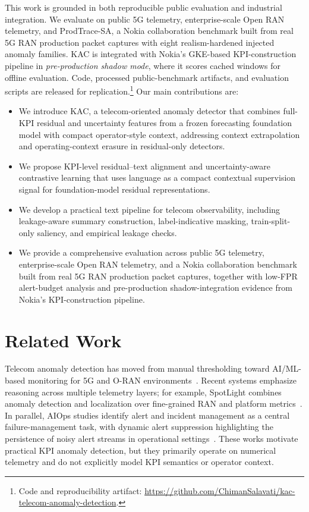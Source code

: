 \documentclass[conference]{IEEEtran}
\begin{document}
This work is grounded in both reproducible public evaluation and industrial integration. We evaluate on public 5G telemetry, enterprise-scale Open RAN telemetry, and ProdTrace-SA, a Nokia collaboration benchmark built from real 5G RAN production packet captures with eight realism-hardened injected anomaly families. KAC is integrated with Nokia's GKE-based KPI-construction pipeline in \emph{pre-production shadow mode}, where it scores cached windows for offline evaluation. Code, processed public-benchmark artifacts, and evaluation scripts are released for replication.\footnote{Code and reproducibility artifact: \url{https://github.com/ChimanSalavati/kac-telecom-anomaly-detection}.} Our main contributions are:
\begin{itemize}[leftmargin=*,nosep]
    \item We introduce KAC, a telecom-oriented anomaly detector that combines full-KPI residual and uncertainty features from a frozen forecasting foundation model with compact operator-style context, addressing context extrapolation and operating-context erasure in residual-only detectors.

    \item We propose KPI-level residual--text alignment and uncertainty-aware contrastive learning that uses language as a compact contextual supervision signal for foundation-model residual representations.

    \item We develop a practical text pipeline for telecom observability, including leakage-aware summary construction, label-indicative masking, train-split-only saliency, and empirical leakage checks.

    \item We provide a comprehensive evaluation across public 5G telemetry, enterprise-scale Open RAN telemetry, and a Nokia collaboration benchmark built from real 5G RAN production packet captures, together with low-FPR alert-budget analysis and pre-production shadow-integration evidence from Nokia's KPI-construction pipeline.
\end{itemize}

\section{Related Work}
\label{sec:related}

Telecom anomaly detection has moved from manual thresholding toward AI/ML-based monitoring for 5G and O-RAN environments~\cite{edozie2025telecomsurvey,azkaei2025oranmetrics,kumar2025falcon}. Recent systems emphasize reasoning across multiple telemetry layers; for example, SpotLight combines anomaly detection and localization over fine-grained RAN and platform metrics~\cite{sun2024spotlight}. In parallel, AIOps studies identify alert and incident management as a central failure-management task, with dynamic alert suppression highlighting the persistence of noisy alert streams in operational settings~\cite{yu2024alertsurvey,bhukar2024dynamic,zhang2024aiopsllm}. These works motivate practical KPI anomaly detection, but they primarily operate on numerical telemetry and do not explicitly model KPI semantics or operator context.
\end{document}
